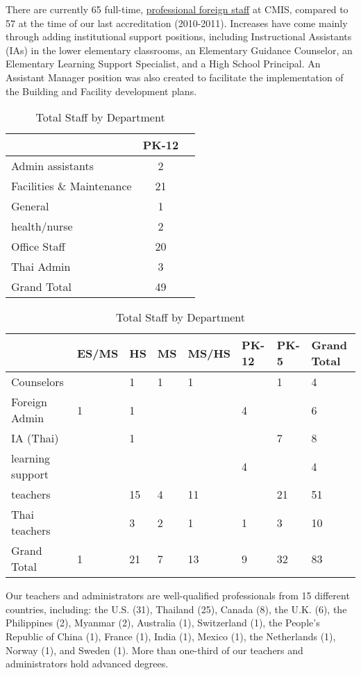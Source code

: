 There are currently 65 full-time, \href{http://cmis.ac.th/about/faculty}{professional foreign staff} at CMIS, compared to 57 at the time of our last accreditation (2010-2011).  Increases have come mainly through adding institutional support positions, including Instructional Assistants (IAs) in the lower elementary classrooms, an Elementary Guidance Counselor, an Elementary Learning Support Specialist, and a High School Principal.  An Assistant Manager position was also created to facilitate the implementation of the Building and Facility development plans.  

\begin{table}[h]
\caption{Total Staff by Department}
\label{table:7}
\begin{tabu}{|X|c|c|}
\hline
&
PK-12 \\
\hline
Admin assistants &
2 \\
\hline
Facilities \& Maintenance &
21 \\
\hline
General &
1 \\
\hline
health/nurse &
2 \\
\hline
Office Staff &
20 \\
\hline
Thai Admin &
3 \\
\hline
Grand Total &
49 \\
\hline
\end{tabu}
\end{table}


\begin{table}[h]
\caption{Total Staff by Department}
\label{table:9}
\begin{tabu}{|X|X|X|X|X|X|X|X|}
\hline
	 &
ES/MS &
HS &
MS &
MS/HS &
PK-12 &
PK-5 &
Grand Total \\
\hline
Counselors &
&
1 &
1 &
1 &
&
1 &
4 \\
\hline
Foreign Admin &
1 &
1 &
&
&
4 &
&
6 \\
\hline
IA (Thai) &
&
1 &
&
&
&
7 &
8 \\
\hline
learning support & 
&
&
&
&
4 &
&
4 \\
\hline
teachers &
&
15 &
4 &
11 &
&
21 &
51 \\
\hline
Thai teachers &
&
3 &
2 &
1 &
1 &
3 &
10 \\ 
\hline
Grand Total &
1 &
21 &
7 &
13 &
9 &
32 &
83\\
\hline
\end{tabu}
\end{table}


Our teachers and administrators are well-qualified professionals from 15 different countries, including:  the U.S. (31), Thailand (25), Canada (8), the U.K. (6), the Philippines (2), Myanmar (2), Australia (1), Switzerland (1), the People’s Republic of China (1), France (1), India (1), Mexico (1), the Netherlands (1), Norway (1), and Sweden (1).  More than one-third of our teachers and administrators hold advanced degrees.

